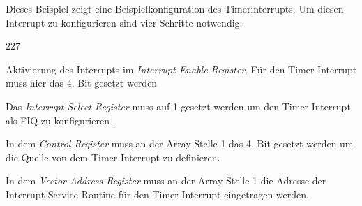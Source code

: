 \newpage
\noindent
Dieses Beispiel zeigt eine Beispielkonfiguration des Timerinterrupts. Um diesen Interrupt zu konfigurieren sind vier Schritte notwendig:
\begin{dinglist}{227}
	\item{Aktivierung des Interrupts im \textit{Interrupt Enable Register}. F\"ur den Timer-Interrupt muss hier das 4. Bit gesetzt werden \parencite[vgl.  Tabelle 4-40][227]{archManI}}
	\item{Das \textit{Interrupt Select Register} muss auf 1 gesetzt werden um den Timer Interrupt als FIQ zu konfigurieren \parencite[vgl Tabelle 3-5][39]{vic}.}
	\item{In dem \textit{Control Register} muss an der Array Stelle 1 das 4. Bit gesetzt werden um die Quelle von dem Timer-Interrupt zu definieren.}
	\item{In dem \textit{Vector Address Register} muss an der Array Stelle 1 die Adresse der Interrupt Service Routine f\"ur den Timer-Interrupt eingetragen werden.}
\end{dinglist}


